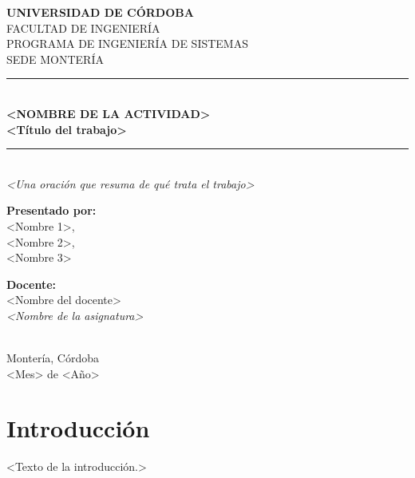 \documentclass[12pt,letterpaper]{article}
\begin{document}
\begin{titlepage}
\centering
\vspace*{1cm}
{\Large \textbf{UNIVERSIDAD DE CÓRDOBA}}\\[0.3cm]
{\large FACULTAD DE INGENIERÍA}\\[0.2cm]
{\large PROGRAMA DE INGENIERÍA DE SISTEMAS}\\[0.2cm]
{\large SEDE MONTERÍA}\\[1.7cm]
\rule{\textwidth}{0.5pt}\\[0.3cm]
{\Huge \textbf{<NOMBRE DE LA ACTIVIDAD>}}\\[0.4cm]
{\LARGE \textbf{<Título del trabajo>}}\\[0.3cm]
\rule{\textwidth}{0.5pt}\\[0.5cm]
{\large \textit{<Una oración que resuma de qué trata el trabajo>}}\\[2.5cm]
\begin{minipage}{0.45\textwidth}
\begin{flushleft}
\textbf{Presentado por:}\\[0.2cm]
<Nombre 1>,\\
<Nombre 2>,\\
<Nombre 3>
\end{flushleft}
\end{minipage}\hfill
\begin{minipage}{0.45\textwidth}
\begin{flushright}
\textbf{Docente:}\\[0.2cm]
<Nombre del docente>\\
\textit{<Nombre de la asignatura>}
\end{flushright}
\end{minipage}\\[2.5cm]
\vfill
Montería, Córdoba\\
<Mes> de <Año>
\end{titlepage}
\newpage

\setcounter{tocdepth}{3}
\tableofcontents
\listoftables
\listoffigures
\newpage


\section*{Introducción}

<Texto de la introducción.>
\end{document}

